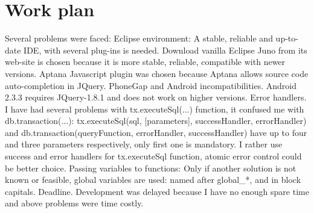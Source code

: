 \section {Work plan}

Several problems were faced:
Eclipse environment: A stable, reliable and up-to-date IDE, with several plug-ins is needed. Download vanilla Eclipse Juno from its web-site is chosen because it is more stable, reliable, compatible with newer versions.  Aptana Javascript plugin was chosen because Aptana allows source code auto-completion in JQuery.
PhoneGap and Android incompatibilities. Android 2.3.3 requires JQuery-1.8.1 and does not work on higher versions. 
Error handlers. I have had several problems with tx.executeSql(...) function, it confused me with db.transaction(...): 
tx.executeSql(sql, [parameters],  successHandler, errorHandler)
and
db.transaction(queryFunction, errorHandler, successHandler)  
have up to four and three parameters respectively, only first one is mandatory. I rather use success and error handlers for tx.executeSql function, atomic error control could be better choice.
Passing variables to functions: Only if another solution is not known or feasible, global variables are used: named after global_*, and in block capitals.
Deadline. Development was delayed because I have no enough spare time and above problems were time costly.

